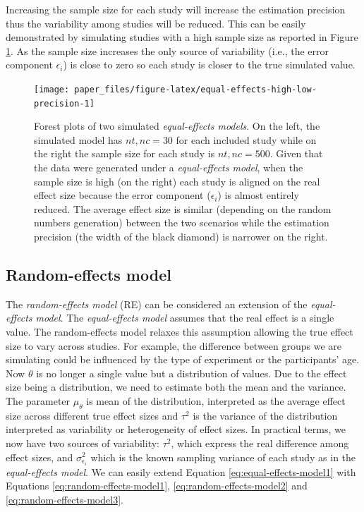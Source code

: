 \documentclass[
  man,floatsintext]{apa6}
\begin{document}
\normalsize

Increasing the sample size for each study will increase the estimation precision thus the variability among studies will be reduced. This can be easily demonstrated by simulating studies with a high sample size as reported in Figure \ref{fig:equal-effects-high-low-precision}. As the sample size increases the only source of variability (i.e., the error component \(\epsilon_{i}\)) is close to zero so each study is closer to the true simulated value.

\scriptsize

\begin{figure}[H]

{\centering \texttt{[image: paper\_files/figure-latex/equal-effects-high-low-precision-1]} 

}

\caption{\color{red} Forest plots of two simulated \emph{equal-effects models}. On the left, the simulated model has \(nt,nc = 30\) for each included study while on the right the sample size for each study is \(nt,nc = 500\). Given that the data were generated under a \emph{equal-effects model}, when the sample size is high (on the right) each study is aligned on the real effect size because the error component (\(\epsilon_{i}\)) is almost entirely reduced. The average effect size is similar (depending on the random numbers generation) between the two scenarios while the estimation precision (the width of the black diamond) is narrower on the right. \color{black}}\label{fig:equal-effects-high-low-precision}
\end{figure}

\normalsize

\hypertarget{re-model}{%
\subsection{Random-effects model}\label{re-model}}

\color{red}

The \emph{random-effects model} (RE) can be considered an extension of the \emph{equal-effects model}. The \emph{equal-effects model} assumes that the real effect is a single value. The random-effects model relaxes this assumption allowing the true effect size to vary across studies. For example, the difference between groups we are simulating could be influenced by the type of experiment or the participants' age.
Now \(\theta\) is no longer a single value but a distribution of values. Due to the effect size being a distribution, we need to estimate both the mean and the variance. The parameter \(\mu_{\theta}\) is mean of the distribution, interpreted as the average effect size across different true effect sizes and \(\tau^{2}\) is the variance of the distribution interpreted as variability or heterogeneity of effect sizes. In practical terms, we now have two sources of variability: \(\tau^{2}\), which express the real difference among effect sizes, and \(\sigma_{\epsilon_i}^{2}\) which is the known sampling variance of each study as in the \emph{equal-effects model}. We can easily extend Equation \eqref{eq:equal-effects-model1} with Equations \eqref{eq:random-effects-model1}, \eqref{eq:random-effects-model2} and \eqref{eq:random-effects-model3}.
\end{document}
